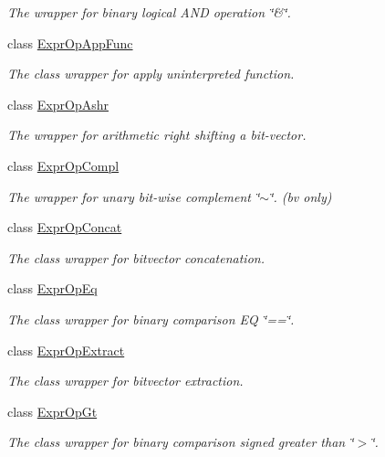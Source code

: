 \begin{DoxyCompactItemize}
\begin{DoxyCompactList}\small\item\em The wrapper for binary logical A\+ND operation \char`\"{}\&\char`\"{}. \end{DoxyCompactList}\item 
class \mbox{\hyperlink{classilang_1_1_expr_op_app_func}{Expr\+Op\+App\+Func}}
\begin{DoxyCompactList}\small\item\em The class wrapper for apply uninterpreted function. \end{DoxyCompactList}\item 
class \mbox{\hyperlink{classilang_1_1_expr_op_ashr}{Expr\+Op\+Ashr}}
\begin{DoxyCompactList}\small\item\em The wrapper for arithmetic right shifting a bit-\/vector. \end{DoxyCompactList}\item 
class \mbox{\hyperlink{classilang_1_1_expr_op_compl}{Expr\+Op\+Compl}}
\begin{DoxyCompactList}\small\item\em The wrapper for unary bit-\/wise complement \char`\"{}$\sim$\char`\"{}. (bv only) \end{DoxyCompactList}\item 
class \mbox{\hyperlink{classilang_1_1_expr_op_concat}{Expr\+Op\+Concat}}
\begin{DoxyCompactList}\small\item\em The class wrapper for bitvector concatenation. \end{DoxyCompactList}\item 
class \mbox{\hyperlink{classilang_1_1_expr_op_eq}{Expr\+Op\+Eq}}
\begin{DoxyCompactList}\small\item\em The class wrapper for binary comparison EQ \char`\"{}==\char`\"{}. \end{DoxyCompactList}\item 
class \mbox{\hyperlink{classilang_1_1_expr_op_extract}{Expr\+Op\+Extract}}
\begin{DoxyCompactList}\small\item\em The class wrapper for bitvector extraction. \end{DoxyCompactList}\item 
class \mbox{\hyperlink{classilang_1_1_expr_op_gt}{Expr\+Op\+Gt}}
\begin{DoxyCompactList}\small\item\em The class wrapper for binary comparison signed greater than \char`\"{}$>$\char`\"{}. \end{DoxyCompactList}\item 

\end{DoxyCompactItemize}
